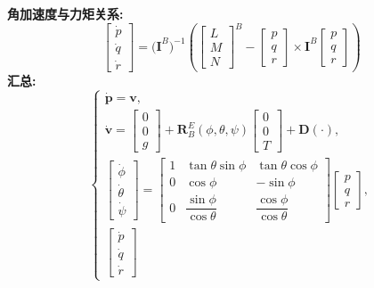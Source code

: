 \documentclass[../main.tex]{subfiles}
\begin{document}
\begin{enumerate}
{{\bigskip
\noindent\textbf{角加速度与力矩关系:}
\[
\begin{bmatrix}\dot{p}\\[6pt]\dot{q}\\[6pt]\dot{r}\end{bmatrix}
=
\big(\mathbf{I}^B\big)^{-1}
\left(\begin{bmatrix}L\\[4pt]M\\[4pt]N\end{bmatrix}^B
-
\begin{bmatrix}p\\[4pt]q\\[4pt]r\end{bmatrix}
\times
\mathbf{I}^B
\begin{bmatrix}p\\[4pt]q\\[4pt]r\end{bmatrix}\right)
\]
}}
\bigskip
\noindent\textbf{汇总:}
\[
\begin{cases}
\dot{\mathbf{p}}=\mathbf{v},\\[6pt]
\dot{\mathbf{v}}=
\begin{bmatrix}0\\[4pt]0\\[4pt]g\end{bmatrix}
+
\mathbf{R}_B^E(\phi,\theta,\psi)
\begin{bmatrix}0\\[4pt]0\\[4pt]T\end{bmatrix}
+\mathbf{D}(\cdot),\\[8pt]
\begin{bmatrix}\dot{\phi}\\[4pt]\dot{\theta}\\[4pt]\dot{\psi}\end{bmatrix}
=
\begin{bmatrix}
1 & \tan\theta\sin\phi & \tan\theta\cos\phi\\[6pt]
0 & \cos\phi & -\sin\phi\\[6pt]
0 & \dfrac{\sin\phi}{\cos\theta} & \dfrac{\cos\phi}{\cos\theta}
\end{bmatrix}
\begin{bmatrix}p\\[4pt]q\\[4pt]r\end{bmatrix},\\[8pt]
\begin{bmatrix}\dot{p}\\[4pt]\dot{q}\\[4pt]\dot{r}\end{bmatrix}

\end{cases}\]
\end{enumerate}
\end{document}
